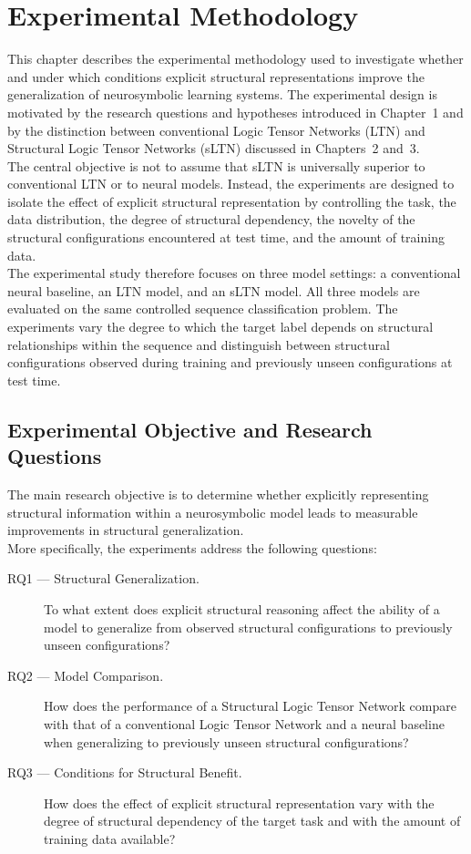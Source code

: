 \chapter{Experimental Methodology}
\label{chap:experiments}


\noindent
This chapter describes the experimental methodology used to investigate whether and under which conditions explicit structural representations improve the generalization of neurosymbolic learning systems. The experimental design is motivated by the research questions and hypotheses introduced in Chapter~1 and by the distinction between conventional Logic Tensor Networks (LTN) and Structural Logic Tensor Networks (sLTN) discussed in Chapters~2 and~3.
\\
The central objective is not to assume that sLTN is universally superior to conventional LTN or to neural models. Instead, the experiments are designed to isolate the effect of explicit structural representation by controlling the task, the data distribution, the degree of structural dependency, the novelty of the structural configurations encountered at test time, and the amount of training data.
\\
The experimental study therefore focuses on three model settings: a conventional neural baseline, an LTN model, and an sLTN model. All three models are evaluated on the same controlled sequence classification problem. The experiments vary the degree to which the target label depends on structural relationships within the sequence and distinguish between structural configurations observed during training and previously unseen configurations at test time.

\section{Experimental Objective and Research Questions}

\noindent
The main research objective is to determine whether explicitly representing structural information within a neurosymbolic model leads to measurable improvements in structural generalization.
\\
More specifically, the experiments address the following questions:

\begin{description}
\item[RQ1 --- Structural Generalization.]
To what extent does explicit structural reasoning affect the ability of a model to generalize from observed structural configurations to previously unseen configurations?


\item[RQ2 --- Model Comparison.]
How does the performance of a Structural Logic Tensor Network compare with that of a conventional Logic Tensor Network and a neural baseline when generalizing to previously unseen structural configurations?

\item[RQ3 --- Conditions for Structural Benefit.]
How does the effect of explicit structural representation vary with the degree of structural dependency of the target task and with the amount of training data available?


\end{description}

